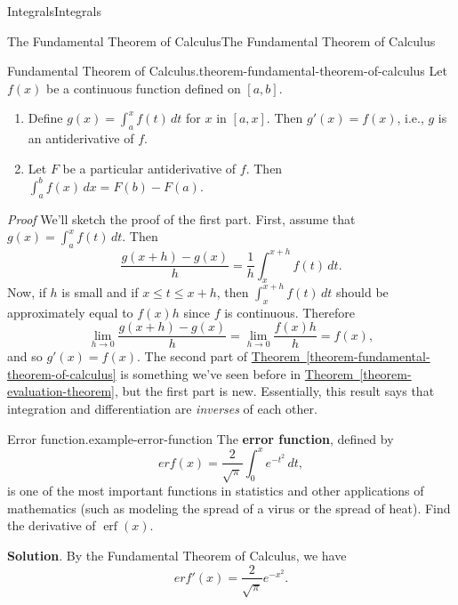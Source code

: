 \documentclass[10pt,]{book}
\makeatletter
\newcommand{\terminology}[1]{\textbf{#1}}
\renewcommand*{\proofname}{Proof}
\renewenvironment{proof}[1][\proofname]{\par
  \pushQED{\qed}%
  \normalfont \topsep6\p@\@plus6\p@\relax
  \trivlist
  \item\relax
    {\itshape
    #1\@addpunct{.}}\hspace\labelsep\ignorespaces
}{%
  \popQED\endtrivlist\@endpefalse
}
\numberwithin{equation}{section}
\newcommand{\erf}[1]{\operatorname{erf} #1}
\makeatother
\begin{document}
\begin{chapterptx}{Integrals}{}{Integrals}{}{}
\begin{sectionptx}{The Fundamental Theorem of Calculus}{}{The Fundamental Theorem of Calculus}{}{}
\begin{theorem}{Fundamental Theorem of Calculus.}{}{theorem-fundamental-theorem-of-calculus}
\hypertarget{p-466}{}%
Let \(f(x)\) be a continuous function defined on \([a,b]\).%
\leavevmode%
\begin{enumerate}
\item\hypertarget{li-40}{}Define \(g(x) = \int_{a}^{x}f(t)\,dt\) for \(x\) in \([a,x]\). Then \(g'(x) = f(x)\), i.e., \(g\) is an antiderivative of \(f\).%
\item\hypertarget{li-41}{}Let \(F\) be a particular antiderivative of \(f\). Then \(\int_{a}^{b}f(x)\,dx = F(b) - F(a).\)%
\end{enumerate}
\end{theorem}
\begin{proof}\hypertarget{proof-11}{}
\hypertarget{p-467}{}%
We'll sketch the proof of the first part. First, assume that \(g(x) = \int_{a}^{x}f(t)\,dt\). Then%
\begin{equation*}
\frac{g(x+h)-g(x)}{h} = \frac{1}{h}\int_{x}^{x+h}f(t)\,dt.
\end{equation*}
Now, if \(h\) is small and if \(x\leq t\leq x+h\), then \(\int_{x}^{x+h}f(t)\,dt\) should be approximately equal to \(f(x)h\) since \(f\) is continuous. Therefore%
\begin{equation*}
\lim_{h\to0}\frac{g(x+h)-g(x)}{h} = \lim_{h\to0}\frac{f(x)h}{h} = f(x),
\end{equation*}
and so \(g'(x) = f(x)\).%
\end{proof}
\hypertarget{p-468}{}%
The second part of \hyperref[theorem-fundamental-theorem-of-calculus]{Theorem~\ref{theorem-fundamental-theorem-of-calculus}} is something we've seen before in \hyperref[theorem-evaluation-theorem]{Theorem~\ref{theorem-evaluation-theorem}}, but the first part is new. Essentially, this result says that integration and differentiation are \emph{inverses} of each other.%
\begin{example}{Error function.}{example-error-function}%
\hypertarget{p-469}{}%
The \terminology{error function}, defined by%
\begin{equation*}
erf(x) = \frac{2}{\sqrt{\pi}}\int_{0}^{x}e^{-t^{2}}\,dt,
\end{equation*}
is one of the most important functions in statistics and other applications of mathematics (such as modeling the spread of a virus or the spread of heat). Find the derivative of \(\erf(x)\).%
\par\smallskip%
\noindent\textbf{Solution}.\hypertarget{solution-102}{}\quad%
\hypertarget{p-470}{}%
By the Fundamental Theorem of Calculus, we have%
\begin{equation*}
erf'(x) = \frac{2}{\sqrt{\pi}}e^{-x^{2}}.

\end{equation*}
\end{example}
\end{sectionptx}
\end{chapterptx}
\end{document}
